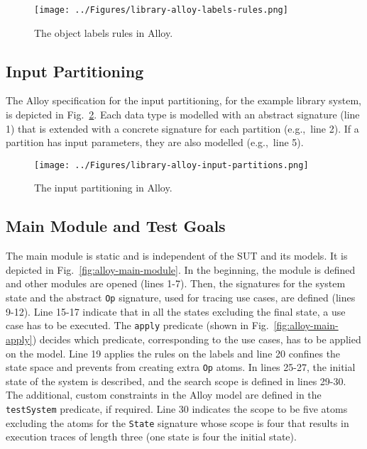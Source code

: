 \begin{figure}[h]
\centering
\texttt{[image: ../Figures/library-alloy-labels-rules.png]}
\caption{The object labels rules in Alloy.}
\label{fig:library-alloy-labels-rules}
\end{figure}

\subsection{Input Partitioning}
\label{sec:alloy-input-partitioning}
The Alloy specification for the input partitioning, for the example library system, is depicted in Fig.~\ref{fig:library-alloy-input-partitions}. Each data type is modelled with an abstract signature (line 1) that is extended with a concrete signature for each partition (e.g.,\ line 2). If a partition has input parameters, they are also modelled (e.g.,\ line 5).

\begin{figure}[h]
\centering
\texttt{[image: ../Figures/library-alloy-input-partitions.png]}
\caption{The input partitioning in Alloy.}
\label{fig:library-alloy-input-partitions}
\end{figure}


\subsection{Main Module and Test Goals}
\label{sec:alloy-main-module}
The main module is static and is independent of the SUT and its models. It is depicted in Fig.~\ref{fig:alloy-main-module}. In the beginning, the module is defined and other modules are opened (lines 1-7). Then, the signatures for the system state and the abstract \texttt{Op} signature, used for tracing use cases, are defined (lines 9-12). Line 15-17 indicate that in all the states excluding the final state, a use case has to be executed.  The \texttt{apply} predicate (shown in Fig.~\ref{fig:alloy-main-apply}) decides which predicate, corresponding to the use cases, has to be applied on the model. Line 19 applies the rules on the labels and line 20 confines the state space and prevents from creating extra \texttt{Op} atoms. In lines 25-27, the initial state of the system is described, and the search scope is defined in lines 29-30. The additional, custom constraints in the Alloy model are defined in the \texttt{testSystem} predicate, if required. Line 30 indicates the scope to be five atoms excluding the atoms for the \texttt{State} signature whose scope is four that results in execution traces of length three (one state is four the initial state).

